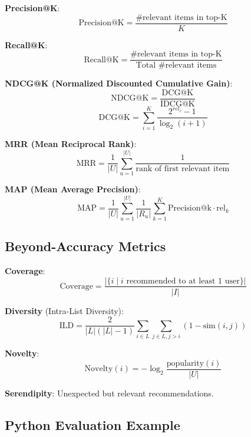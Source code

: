 \documentclass[10pt]{article}
\begin{document}
\textbf{Precision@K}:
\[
\text{Precision@K} = \frac{\text{\# relevant items in top-K}}{K}
\]

\textbf{Recall@K}:
\[
\text{Recall@K} = \frac{\text{\# relevant items in top-K}}{\text{Total \# relevant items}}
\]

\textbf{NDCG@K (Normalized Discounted Cumulative Gain)}:
\[
\text{NDCG@K} = \frac{\text{DCG@K}}{\text{IDCG@K}}
\]
\[
\text{DCG@K} = \sum_{i=1}^{K} \frac{2^{rel_i} - 1}{\log_2(i+1)}
\]

\textbf{MRR (Mean Reciprocal Rank)}:
\[
\text{MRR} = \frac{1}{|U|} \sum_{u=1}^{|U|} \frac{1}{\text{rank of first relevant item}}
\]

\textbf{MAP (Mean Average Precision)}:
\[
\text{MAP} = \frac{1}{|U|} \sum_{u=1}^{|U|} \frac{1}{|R_u|} \sum_{k=1}^{K} \text{Precision@k} \cdot \text{rel}_k
\]

\subsection{Beyond-Accuracy Metrics}

\textbf{Coverage}:
\[
\text{Coverage} = \frac{|\{i \mid i \text{ recommended to at least 1 user}\}|}{|I|}
\]

\textbf{Diversity} (Intra-List Diversity):
\[
\text{ILD} = \frac{2}{|L|(|L|-1)} \sum_{i \in L} \sum_{j \in L, j>i} (1 - \text{sim}(i, j))
\]

\textbf{Novelty}:
\[
\text{Novelty}(i) = -\log_2 \frac{\text{popularity}(i)}{|U|}
\]

\textbf{Serendipity}: Unexpected but relevant recommendations.

\subsection{Python Evaluation Example}
\end{document}

